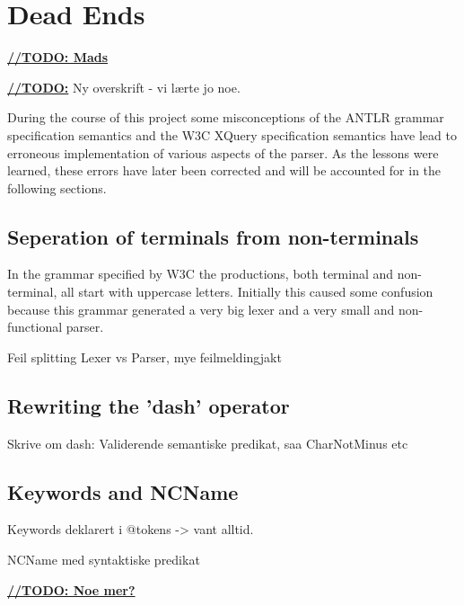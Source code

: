 \section{Dead Ends}
\label{sect:discussion:deadEnds}
\underline{\textbf{\LARGE //TODO: Mads}}

\underline{\textbf{\LARGE //TODO:}} Ny overskrift - vi l\ae rte jo noe.

During the course of this project some misconceptions of the ANTLR grammar specification semantics and the W3C XQuery specification semantics have lead to erroneous implementation of various aspects of the parser. As the lessons were learned, these errors have later been corrected and will be accounted for in the following sections.

\subsection{Seperation of terminals from non-terminals }

In the grammar specified by W3C the productions, both terminal and non-terminal, all start with uppercase letters. Initially this caused some confusion because this grammar generated a very big lexer and a very small and non-functional parser. 

Feil splitting Lexer vs Parser, mye feilmeldingjakt

\subsection{Rewriting the 'dash' operator}
Skrive om dash: Validerende semantiske predikat, saa CharNotMinus etc

\subsection{Keywords and NCName}
Keywords deklarert i @tokens -> vant alltid.

NCName med syntaktiske predikat

\underline{\textbf{\LARGE //TODO: Noe mer?}}